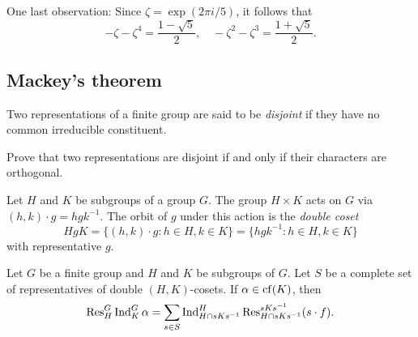 One last observation: 
Since $\zeta=\exp(2\pi i/5)$, it follows
that 
\[
-\zeta-\zeta^4=\frac{1-\sqrt{5}}{2},
\quad 
-\zeta^2-\zeta^3=\frac{1+\sqrt{5}}{2}.
\]











\subsection{Mackey's theorem}

\begin{definition}
    Two representations of a finite group 
    are said to be \emph{disjoint} if they have no common 
    irreducible constituent. 
\end{definition}

\begin{exercise}
\label{xca:disjoint}
    Prove that 
    two representations are disjoint if and only if their characters are orthogonal. 
\end{exercise}

Let $H$ and $K$ be subgroups of a group $G$. 
The group $H\times K$ acts on $G$ via $(h,k)\cdot g=hgk^{-1}$. 
The orbit of $g$ under this action is 
the \emph{double coset} 
\[
HgK=\{(h,k)\cdot g:h\in H,k\in K\}
=\{hgk^{-1}:h\in H,k\in K\}
\]
with representative $g$. 

\begin{theorem}[Mackey]
\label{thm:Mackey}
    Let $G$ be a finite group and $H$ and $K$ be 
    subgroups of $G$. Let $S$ be a complete set 
    of representatives of double $(H,K)$-cosets. If $\alpha\in\operatorname{cf}(K)$, then 
    \[
    \operatorname{Res}_H^G\operatorname{Ind}_K^G\alpha=\sum_{s\in S}\operatorname{Ind}_{H\cap sKs^{-1}}^H\operatorname{Res}_{H\cap sKs^{-1}}^{sKs^{-1}}(s\cdot f).
    \]
\end{theorem}


